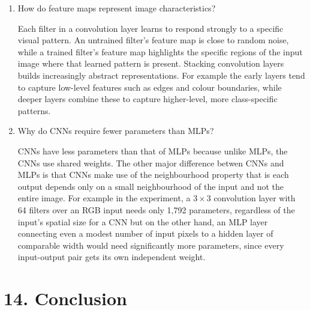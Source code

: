 \documentclass[11pt]{article}
\begin{document}
\begin{enumerate}
\item How do feature maps represent image characteristics?

Each filter in a convolution layer learns to respond strongly to a specific visual pattern. An untrained filter's feature map is close to random noise, while a trained filter's feature map highlights the specific regions of the input image where that learned pattern is present. Stacking convolution layers builds increasingly abstract representations. For example the early layers tend to capture low-level features such as edges and colour boundaries, while deeper layers combine these to capture higher-level, more class-specific patterns.

\item Why do CNNs require fewer parameters than MLPs?

CNNs have less parameters than that of MLPs because unlike MLPs, the CNNs use shared weights. The other major difference betwen CNNs and MLPs is that CNNs make use of the neighbourhood property that is each output depends only on a small neighbourhood of the input and not the entire image. For example in the experiment, a $3\times3$ convolution layer with 64 filters over an RGB input needs only 1,792 parameters, regardless of the input's spatial size for a CNN but on the other hand, an MLP layer connecting even a modest number of input pixels to a hidden layer of comparable width would need significantly more parameters, since every input-output pair gets its own independent weight.

\end{enumerate}

\section*{14. Conclusion}
\end{document}

